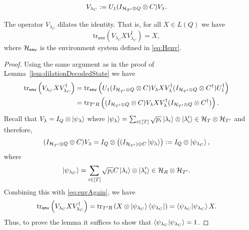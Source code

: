 \documentclass[10pt]{article}
\newcommand{\tr}{\mathrm{tr}}
\newcommand{\p}[1]{\left(#1\right)}
\newcommand{\s}[1]{\mathsf{#1}}
\begin{document}
    \[V_{\lambda_{C}}:=U_1(I_{{\cal H}_{T'}\otimes Q}\otimes C) V_{\lambda}.\]
    \begin{lemma} The operator $V_{\lambda_C}$ dilates the identity. That is, for all $X\in L(Q)$ we have  
    \[\tr_{\s{env}}\p{V_{\lambda_C}XV_{\lambda_C}^\dag}=X,\]
    where $\calH_{\s{env}}$ is the environment system defined in \eqref{eq:Henv}. 
    \end{lemma}
    \begin{proof}
        Using the same argument as in the proof of Lemma~\ref{lem:dilationDecodedState} we have 
       \begin{align}
           \tr_{\s{env}}\p{V_{\lambda_C}XV_{\lambda_C}^\dag}&\nonumber=\tr_{\s{env}}\p{U_1(I_{\calH_{T'}\otimes Q}\otimes C) V_{\lambda}XV_{\lambda}^\dag (I_{\calH_{T'}\otimes Q}\otimes C^\dag)U_1^\dag} \\&=\tr_{T'R}\p{(I_{\calH_{T'}\otimes Q}\otimes C) V_{\lambda}XV_{\lambda}^\dag (I_{\calH_{T'}\otimes Q}\otimes C^\dag)}.\label{eq:envAgain}
       \end{align}
        Recall that $V_{\lambda}= I_Q\otimes \ket{\psi_{\lambda}}$ where $\ket{\psi_{\lambda}}=\sum_{i\in[T]}\sqrt{p_i}\ket{\lambda_{i}}\otimes \ket{\lambda_{i}'}\in {\cal H}_T\otimes {\cal H}_{T'}$ and therefore,
        \begin{align*}
            (I_{\calH_{T'}\otimes Q}\otimes C) V_{\lambda}=I_{Q}\otimes \p{ (I_{\calH_{T'})\otimes C}\ket{\psi_{\lambda}}}:=I_Q\otimes \ket{\psi_{\lambda_{C}}},
        \end{align*}
        where 
        \begin{equation}
            \ket{\psi_{\lambda_{C}}}=\sum_{i\in[T]}\sqrt{p_i} C\ket{\lambda_i}\otimes \ket{\lambda_{i}'}\in {\cal H}_{R}\otimes {\cal H}_{T'}.\label{eq:psiLanbdaCdef}
        \end{equation}
    Combining this with \eqref{eq:envAgain}, we have 
    \[\tr_{\s{env}}\p{V_{\lambda_C}XV_{\lambda_C}^\dag}=\tr_{T'R}\p{X\otimes \ket{\psi_{\lambda_C}}\bra{\psi_{\lambda_C}}}=\braket{\psi_{\lambda_C} | \psi_{\lambda_C}} X.\]
Thus, to prove the lemma it suffices to show that $\braket{\psi_{\lambda_C} | \psi_{\lambda_C}}=1$. 
    

\end{proof}
\end{document}
